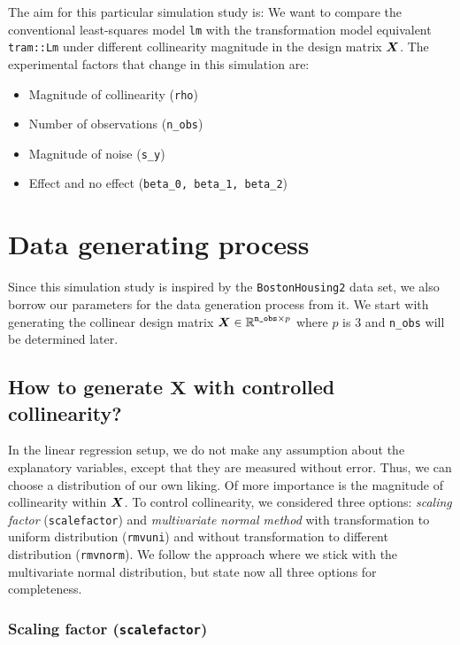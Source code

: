 \documentclass[11pt,a4paper,twoside]{book}\usepackage[]{graphicx}\usepackage[]{xcolor}
\begin{document}
The aim for this particular simulation study is: We want to compare the conventional least-squares model \texttt{lm} with the transformation model equivalent \texttt{tram::Lm} under different collinearity magnitude in the design matrix ${\boldsymbol{X}}$. The experimental factors that  change in this simulation are:
\begin{itemize}
\item Magnitude of collinearity (\texttt{rho})
\item Number of observations (\texttt{n\_obs})
\item Magnitude of noise (\texttt{s\_y})
\item Effect and no effect (\texttt{beta\_0, beta\_1, beta\_2})
\end{itemize}

\section{Data generating process}

Since this simulation study is inspired by the \texttt{BostonHousing2} data set, we also borrow our parameters for the data generation process from it. We start with generating the collinear design matrix $\boldsymbol{X}\in \operatorname{\mathbb{R}}^{\texttt{n\_obs}\times p}$ where $p$ is 3 and \texttt{n\_obs} will be determined later. 

\subsection{How to generate $\boldsymbol{X}$ with controlled collinearity?}

In the linear regression setup, we do not make any assumption about the explanatory variables, except that they are measured without error. Thus, we can choose a distribution of our own liking. Of more importance is the magnitude of collinearity within ${\boldsymbol{X}}$.
To control collinearity, we considered three options: \textit{scaling factor} (\texttt{scalefactor}) and \textit{multivariate normal method} with transformation to uniform distribution (\texttt{rmvuni}) and without transformation to different distribution (\texttt{rmvnorm}). We follow the approach where we stick with the multivariate normal distribution, but state now all three options for completeness.

\subsubsection{Scaling factor (\texttt{scalefactor})}\label{section:scaling}
\end{document}
